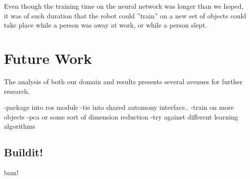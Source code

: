 \documentclass{article}
\begin{document}
Even though the training time on the neural network was longer than we hoped, it was of such duration that the robot could ''train'' on a new set of objects could take place while a person was away at work, or while a person slept.

\section{Future Work}
The analysis of both our domain and results presents several avenues for further research.

-package into ros module
-tie into shared automony interface..
-train on more objects
-pca or some sort of dimension reduction
-try against different learning algorithms

\subsection{Buildit!}
bam!



\end{document}
